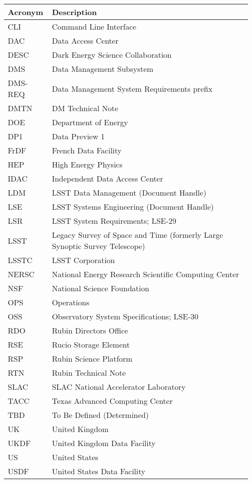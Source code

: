 \addtocounter{table}{-1}
\begin{longtable}{p{}p{}}\hline
\textbf{Acronym} & \textbf{Description}  \\\hline

CLI & Command Line Interface \\\hline
DAC & Data Access Center \\\hline
DESC & Dark Energy Science Collaboration \\\hline
DMS & Data Management Subsystem \\\hline
DMS-REQ & Data Management System Requirements prefix \\\hline
DMTN & DM Technical Note \\\hline
DOE & Department of Energy \\\hline
DP1 & Data Preview 1 \\\hline
FrDF & French Data Facility \\\hline
HEP &  High Energy Physics \\\hline
IDAC & Independent Data Access Center \\\hline
LDM & LSST Data Management (Document Handle) \\\hline
LSE & LSST Systems Engineering (Document Handle) \\\hline
LSR & LSST System Requirements; LSE-29 \\\hline
LSST & Legacy Survey of Space and Time (formerly Large Synoptic Survey Telescope) \\\hline
LSSTC & LSST Corporation \\\hline
NERSC & National Energy Research Scientific Computing Center \\\hline
NSF & National Science Foundation \\\hline
OPS & Operations \\\hline
OSS & Observatory System Specifications; LSE-30 \\\hline
RDO & Rubin Directors Office \\\hline
RSE & Rucio Storage Element \\\hline
RSP & Rubin Science Platform \\\hline
RTN & Rubin Technical Note \\\hline
SLAC & SLAC National Accelerator Laboratory \\\hline
TACC & Texas Advanced Computing Center \\\hline
TBD & To Be Defined (Determined) \\\hline
UK & United Kingdom \\\hline
UKDF & United Kingdom Data Facility \\\hline
US & United States \\\hline
USDF & United States Data Facility \\\hline
\end{longtable}
